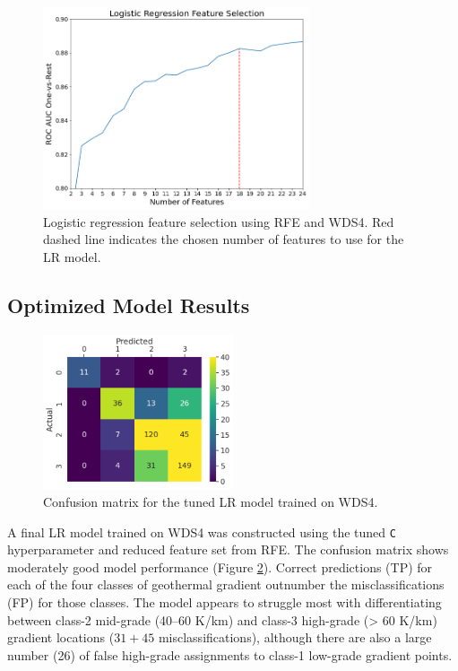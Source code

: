 \begin{figure}
\centering
\includegraphics[width=0.70\textwidth]{templates/images/Figure-LR_feature_selection.png}
\singlespacing
\caption[Logistic regression feature selection]{Logistic regression feature selection using RFE and WDS4. Red dashed line indicates the chosen number of features to use for the LR model.}
\label{fig:logreg_rfe}
\end{figure}

\subsection{Optimized Model Results}\label{ch5:lr_final_results}

\begin{figure}
\centering
\includegraphics[width=0.5\textwidth]{templates/images/Figure-LR-ConfusionMatrix.png}
\singlespacing
\caption[Logistic regression confusion matrix]{Confusion matrix for the tuned LR model trained on WDS4.}
\label{fig:logreg_conf_matrix}
\end{figure}

A final LR model trained on WDS4 was constructed using the tuned \verb|C| hyperparameter and reduced feature set from RFE. The confusion matrix shows moderately good model performance (Figure \ref{fig:logreg_conf_matrix}). Correct predictions (TP) for each of the four classes of geothermal gradient outnumber the misclassifications (FP) for those classes. The model appears to struggle most with differentiating between class-2 mid-grade (40--60 K/km) and class-3 high-grade (> 60 K/km) gradient locations ($31+45$ misclassifications), although there are also a large number (26) of false high-grade assignments to class-1 low-grade gradient points.

